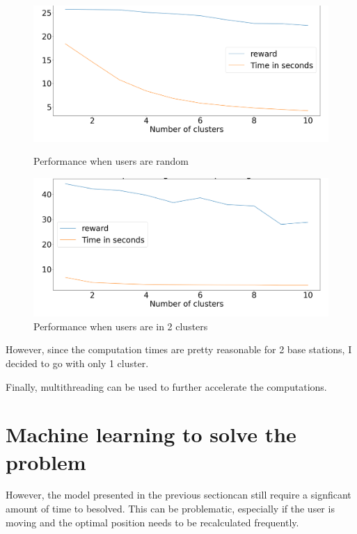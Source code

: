 \documentclass[letterpaper]{article}
\begin{document}
\begin{figure}[H]
    \centering
    \begin{minipage}[b]{0.45\textwidth}
        \centering
        \includegraphics[width=\textwidth]{images/Performance_opt_function_clusters.png}
        \caption{Performance when users are random}
    \end{minipage}
    \hspace{0.05\textwidth}
    \begin{minipage}[b]{0.45\textwidth}
        \centering
        \includegraphics[width=\textwidth]{images/Performance_opt_function_clusters_when_2clusters.png}
        \caption{Performance when users are in 2 clusters}
    \end{minipage}
\end{figure}

However, since the computation times are pretty reasonable for 2 base stations, I decided to go with only 1 cluster.

Finally, multithreading can be used to further accelerate the computations.

\section{Machine learning to solve the problem}

However, the model presented in the previous sectioncan still require a signficant amount of time to besolved.
This can be problematic, especially if the user is moving and the optimal position needs to be recalculated frequently.
\end{document}
